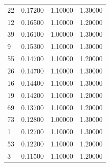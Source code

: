 \begin{tabular}{lrrr}
22 & 0.17200 & 1.10000 & 1.30000 \\
12 & 0.16500 & 1.10000 & 1.20000 \\
39 & 0.16100 & 1.00000 & 1.30000 \\
9 & 0.15300 & 1.10000 & 1.30000 \\
55 & 0.14700 & 1.10000 & 1.20000 \\
26 & 0.14700 & 1.10000 & 1.30000 \\
16 & 0.14400 & 1.10000 & 1.30000 \\
19 & 0.14200 & 1.10000 & 1.20000 \\
69 & 0.13700 & 1.10000 & 1.20000 \\
73 & 0.12800 & 1.00000 & 1.30000 \\
1 & 0.12700 & 1.10000 & 1.30000 \\
53 & 0.12200 & 1.10000 & 1.20000 \\
3 & 0.11500 & 1.10000 & 1.20000 \\
\bottomrule
\end{tabular}
